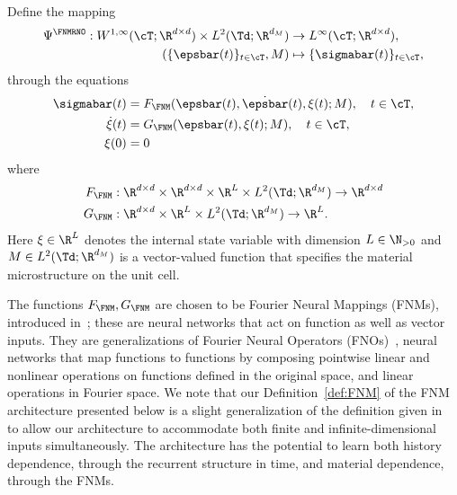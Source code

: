 \documentclass[letterpaper,11pt]{article}
\begin{document}
\begin{definition}\label{def:FNMRNO}
Define the mapping
\begin{subequations}\label{eqn:PsiRNO}
\begin{align}
        \Psi^{\FNMRNO}: W^{1, \infty}(\cT; \R^{d \times d}) \times L^2(\Td; \R^{d_M}) & \to L^\infty(\cT; \R^{d \times d}),\\
    (\{\epsbar(t)\}_{t\in \cT}, M) & \mapsto \{\sigmabar(t)\}_{t\in \cT},
\end{align}
\end{subequations}
through the equations
\begin{subequations}\label{eqn:FNMRNO}
\begin{align}
    \sigmabar(t) &= F_{\FNM}(\epsbar(t), \dot{\epsbar}(t), \xi(t); M), \quad t \in \cT,\\
    \dot{\xi}(t) &= G_{\FNM}(\epsbar(t), \xi(t); M), \quad t \in \cT,\\
    \xi(0) &= 0
\end{align}
\end{subequations}
where
\begin{equation}\label{eq:FNM_dims}
\begin{aligned}
    F_{\FNM}&: \R^{d \times d} \times \R^{d \times d} \times \R^L \times L^2(\Td; \R^{d_M}) \to \R^{d \times d}\\
    G_{\FNM}&: \R^{d \times d} \times \R^L \times L^2(\Td; \R^{d_M}) \to \R^{L}.
\end{aligned}
\end{equation}
Here $\xi \in \R^L$ denotes the internal state variable with dimension  $L \in \N_{>0}$ and $M \in L^2(\Td; \R^{d_M})$ is a vector-valued function that specifies the material microstructure on the unit cell.
\end{definition}

The functions $F_{\FNM}, G_{\FNM}$ are chosen to be Fourier Neural Mappings (FNMs), introduced in~\cite{huang2024operator}; these are neural networks that act on function as well as vector inputs. They are generalizations of Fourier Neural Operators (FNOs)~\cite{li2020fourier}, neural networks that map functions to functions by composing pointwise linear and nonlinear operations on functions defined in the original space, and linear operations in Fourier space. We note that our Definition~\ref{def:FNM} of the FNM architecture presented below is a slight generalization of the definition given in~\cite{huang2024operator} to allow our architecture to accommodate both finite and infinite-dimensional inputs simultaneously.
The architecture has the potential to learn both history dependence, through the recurrent structure in time, and material dependence, through the FNMs.
\end{document}
